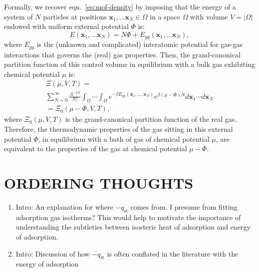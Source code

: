 \documentclass[letterpaper,twocolumn,amsmath,amssymb,jcp,aps,10pt]{revtex4-1}
\newcommand{\xvec}{\mathbf{x}}
\newcommand\V{\Phi}
\begin{document}
Formally, we recover eqn.~\ref{eq:mof-density} by imposing that the energy of a system of $N$ particles at positions $\mathbf{x}_1,...\mathbf{x}_N \in \Omega$ in a space $\Omega$ with volume $V=|\Omega|$ endowed with uniform external potential $\Phi$ is:
\begin{equation}
    E(\mathbf{x}_1,...\mathbf{x}_N) = N\Phi + E_{gg}(\mathbf{x}_1,...\mathbf{x}_N),
\end{equation} where $E_{gg}$ is the (unknown and complicated) interatomic potential for gas-gas interactions that governs the (real) gas properties. Then, the grand-canonical partition function of this control volume in equilibrium with a bulk gas exhibiting chemical potential $\mu$ is:
\begin{multline}
    \Xi(\mu, V, T)= \\ \displaystyle \sum_{N=0}^\infty \frac{\Lambda^{-3N}}{N!} \int_{\Omega} \cdots \int_{\Omega} e^{-\beta E_{gg}(\xvec_1, ..., \xvec_N)} e^{\beta (\mu - \V) N} d\xvec_1 \cdots d\xvec_N \\ =
    \Xi_0(\mu-\V, V, T),
    \label{eq:xi_realgas}
\end{multline} where $\Xi_0(\mu, V, T)$ is the grand-canonical partition function of the real gas. Therefore, the thermodynamic properties of the gas sitting in this external potential $\Phi$, in equilibrium with a bath of gas of chemical potential $\mu$, are equivalent to the properties of the gas at chemical potential $\mu-\V$.

\section{ORDERING THOUGHTS}
{\color{red}
\begin{enumerate}
    \item Intro: An explanation for where $-q_\text{st}$ comes from. I presume from fitting adsorption gas isotherms? This would help to motivate the importance of understanding the subtleties between isosteric heat of adsorption and energy of adsorption.
    \item Intro: Discussion of how $-q_\text{st}$ is often conflated in the literature with the energy of adsorption
\end{enumerate}
}
\end{document}
